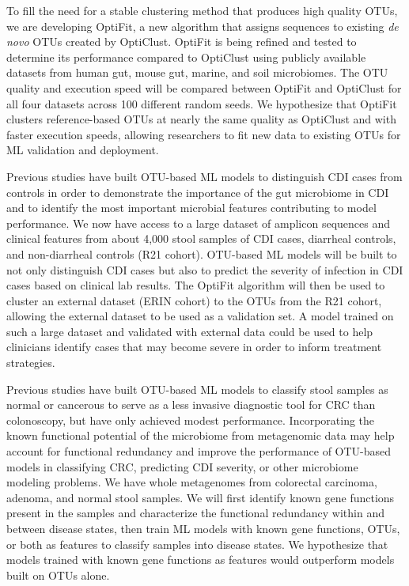 \documentclass[11pt]{article}
\begin{document}
To fill the need for a stable clustering method that produces high quality OTUs,
we are developing OptiFit, a new algorithm that assigns sequences to
existing \textit{de novo} OTUs created by OptiClust.
OptiFit is being refined and tested to determine its performance compared to
OptiClust using publicly available datasets from human gut, mouse gut, marine,
and soil microbiomes.
The OTU quality and execution speed will be compared between OptiFit and
OptiClust for all four datasets across 100 different random seeds.
We hypothesize that OptiFit clusters reference-based OTUs at nearly the same 
quality as OptiClust and with faster execution speeds, allowing researchers to 
fit new data to existing OTUs for ML validation and deployment.

Previous studies have built OTU-based ML models to distinguish CDI
cases from controls in order to demonstrate the importance of the gut microbiome
in CDI and to identify the most important microbial features contributing to
model performance.
We now have access to a large dataset of amplicon sequences and
clinical features from about 4,000 stool samples of CDI cases, diarrheal
controls, and non-diarrheal controls (R21 cohort).
OTU-based ML models will be built to not only distinguish CDI cases but also to
predict the severity of infection in CDI cases based on clinical lab results.
The OptiFit algorithm will then be used to cluster an external dataset (ERIN
cohort) to the OTUs from the R21 cohort, allowing the external dataset to be
used as a validation set.
A model trained on such a large dataset and validated with external data could 
be used to help clinicians identify cases that may become severe in order to inform 
treatment strategies.

Previous studies have built OTU-based ML models to classify stool
samples as normal or cancerous to serve as a less invasive diagnostic tool for
CRC than colonoscopy, but have only achieved modest performance.
Incorporating the known functional potential of the microbiome from metagenomic
data may help account for functional redundancy and improve the performance of
OTU-based models in classifying CRC, predicting CDI severity, or other 
microbiome modeling problems.
We have whole metagenomes from colorectal carcinoma, adenoma, and normal stool
samples.
We will first identify known gene functions present in the samples and 
characterize the functional redundancy within and between disease states,
then train ML models with known gene functions, OTUs, or both as features to 
classify samples into disease states.
We hypothesize that models trained with known gene functions as features 
would outperform models built on OTUs alone.
\end{document}
